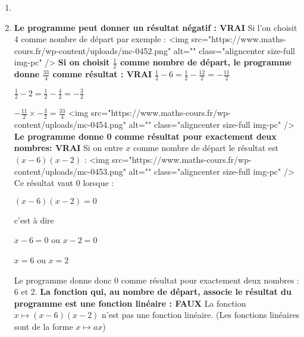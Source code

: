 \begin{corrige}
     \begin{enumerate}
          \item
\begin{center}
\end{center}
          \item
          \textbf{Le programme peut donner un résultat négatif : VRAI}
          Si l'on choisit 4 comme nombre de départ par exemple :
          <img src="https://www.maths-cours.fr/wp-content/uploads/mc-0452.png" alt="" class="aligncenter size-full  img-pc" />
          \textbf{Si on choisit $\frac{1}{2}$ comme nombre de départ, le programme donne $\frac{33}{4}$ comme résultat : VRAI}
          $\frac{1}{2}-6=\frac{1}{2}-\frac{12}{2}=-\frac{11}{2}$
          \par
          $\frac{1}{2}-2=\frac{1}{2}-\frac{4}{2}=-\frac{3}{2}$
          \par
          $-\frac{11}{2}\times -\frac{3}{2}=\frac{33}{4}$
          <img src="https://www.maths-cours.fr/wp-content/uploads/mc-0454.png" alt="" class="aligncenter size-full  img-pc" />
          \textbf{Le programme donne 0 comme résultat pour exactement deux nombres: VRAI}
          Si on entre $x$ comme nombre de départ le résultat est $\left(x-6\right)\left(x-2\right)$ :
          <img src="https://www.maths-cours.fr/wp-content/uploads/mc-0453.png" alt="" class="aligncenter size-full  img-pc" />
          Ce résultat vaut $0$ lorsque :
          \par
          $\left(x-6\right)\left(x-2\right)=0$
          \par
          c'est à dire
          \par
          $x-6=0$ ou $x-2=0$
          \par
          $x=6$ ou $x=2$
          \par
          Le programme donne  donc 0 comme résultat pour exactement deux nombres : 6 et 2.
          \textbf{La fonction qui, au nombre de départ, associe le résultat du programme est une fonction linéaire : FAUX}
          La fonction $x\mapsto \left(x-6\right)\left(x-2\right)$ n'est pas une fonction linéaire. (Les fonctions linéaires sont de la forme $x\mapsto ax$)
     \end{enumerate}
\end{corrige}

